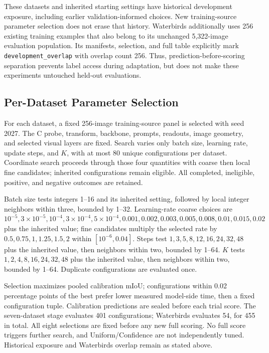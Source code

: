 These datasets and inherited starting settings have historical development exposure, including earlier validation-informed choices. New training-source parameter selection does not erase that history. Waterbirds additionally uses 256 existing training examples that also belong to its unchanged 5,322-image evaluation population. Its manifests, selection, and full table explicitly mark \texttt{development\_overlap} with overlap count 256. Thus, prediction-before-scoring separation prevents label access during adaptation, but does not make these experiments untouched held-out evaluations.

\subsection{Per-Dataset Parameter Selection}
For each dataset, a fixed 256-image training-source panel is selected with seed 2027. The C probe, transform, backbone, prompts, readouts, image geometry, and selected visual layers are fixed. Search varies only batch size, learning rate, update steps, and $K$, with at most 80 unique configurations per dataset. Coordinate search proceeds through those four quantities with coarse then local fine candidates; inherited configurations remain eligible. All completed, ineligible, positive, and negative outcomes are retained.

Batch size tests integers 1--16 and its inherited setting, followed by local integer neighbors within three, bounded by 1--32. Learning-rate coarse choices are $10^{-5},3\times10^{-5},10^{-4},3\times10^{-4},5\times10^{-4},0.001,0.002,0.003,0.005,0.008,0.01,0.015,0.02$ plus the inherited value; fine candidates multiply the selected rate by $0.5,0.75,1,1.25,1.5,2$ within $[10^{-6},0.04]$. Steps test $1,3,5,8,12,16,24,32,48$ plus the inherited value, then neighbors within two, bounded by 1--64. $K$ tests $1,2,4,8,16,24,32,48$ plus the inherited value, then neighbors within two, bounded by 1--64. Duplicate configurations are evaluated once.

Selection maximizes pooled calibration mIoU; configurations within 0.02 percentage points of the best prefer lower measured model-side time, then a fixed configuration tuple. Calibration predictions are sealed before each trial score. The seven-dataset stage evaluates 401 configurations; Waterbirds evaluates 54, for 455 in total. All eight selections are fixed before any new full scoring. No full score triggers further search, and Uniform/Confidence are not independently tuned. Historical exposure and Waterbirds overlap remain as stated above.

